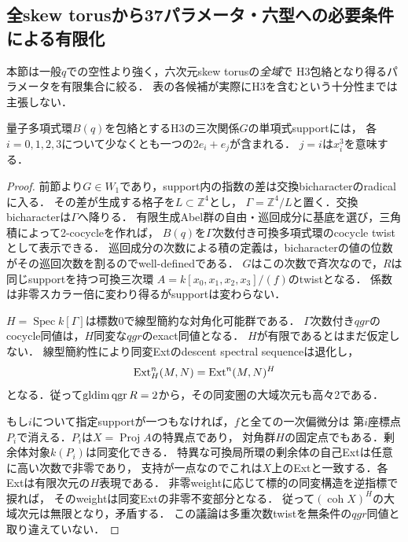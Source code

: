 \subsection{全skew torusから37パラメータ・六型への必要条件による有限化}
\label{sec:skew-finite-reduction}
本節は一般$q$での空性より強く，六次元skew torusの\emph{全域}で
H3包絡となり得るパラメータを有限集合に絞る．
表の各候補が実際にH3を含むという十分性までは主張しない．

\begin{lemma}[座標点のjetによる必要条件]
\label{lem:skew-coordinate-jets}
量子多項式環$B(q)$を包絡とするH3の三次関係$G$の単項式supportには，
各$i=0,1,2,3$について少なくとも一つの$2e_i+e_j$が含まれる．
$j=i$は$x_i^3$を意味する．
\end{lemma}
\begin{proof}
前節より$G\in W_1$であり，support内の指数の差は交換bicharacterのradicalに入る．
その差が生成する格子を$L\subset\mathbb Z^4$とし，
$\Gamma=\mathbb Z^4/L$と置く．交換bicharacterは$\Gamma$へ降りる．
有限生成Abel群の自由・巡回成分に基底を選び，三角積によって2-cocycleを作れば，
$B(q)$を$\Gamma$次数付き可換多項式環のcocycle twistとして表示できる．
巡回成分の次数による積の定義は，bicharacterの値の位数がその巡回次数を割るのでwell-definedである．
$G$はこの次数で斉次なので，$R$は同じsupportを持つ可換三次環
$A=k[x_0,x_1,x_2,x_3]/(f)$のtwistとなる．
係数は非零スカラー倍に変わり得るがsupportは変わらない．

$H=\operatorname{Spec}k[\Gamma]$は標数0で線型簡約な対角化可能群である．
$\Gamma$次数付き$qgr$のcocycle同値は，$H$同変な$qgr$のexact同値となる．
$H$が有限であるとはまだ仮定しない．
線型簡約性により同変Extのdescent spectral sequenceは退化し，
\[
 \operatorname{Ext}^n_H(M,N)=\operatorname{Ext}^n(M,N)^H
\]
となる．従って$\operatorname{gldim}\operatorname{qgr} R=2$から，その同変圏の大域次元も高々2である．

もし$i$について指定supportが一つもなければ，$f$と全ての一次偏微分は
第$i$座標点$P_i$で消える．$P_i$は$X=\operatorname{Proj}A$の特異点であり，
対角群$H$の固定点でもある．剰余体対象$k(P_i)$は同変化できる．
特異な可換局所環の剰余体の自己Extは任意に高い次数で非零であり，
支持が一点なのでこれは$X$上のExtと一致する．各Extは有限次元の$H$表現である．
非零weightに応じて標的の同変構造を逆指標で捩れば，
そのweightは同変Extの非零不変部分となる．
従って$(\operatorname{coh}X)^H$の大域次元は無限となり，矛盾する．
この議論は多重次数twistを無条件の$qgr$同値と取り違えていない．
\end{proof}

